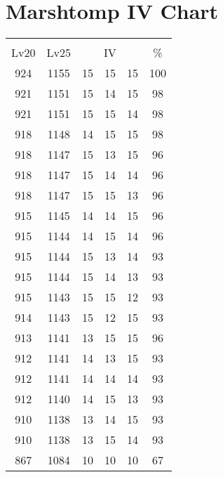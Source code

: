 \documentclass{article}%
\begin{document}
%
\normalsize%
\section{Marshtomp IV Chart}%
\label{sec:Marshtomp IV Chart}%
\renewcommand{\arraystretch}{1.5}%
\begin{tabular}{|c|c|c|c|c|c|}%
\hline%
\multicolumn{6}{|c|}{\textcolor{white}{ 
\linebreak{Marshtomp}
}%
\cellcolor{black}}\\%
\multicolumn{1}{|c}{Lv20}&\multicolumn{1}{c|}{Lv25}&\multicolumn{3}{c|}{IV}&\multicolumn{1}{|c|}{\%}\\%
\hline%
\rowcolor{color100}%
924&1155&15&15&15&100\\%
\hline%
\rowcolor{color98}%
921&1151&15&14&15&98\\%
\hline%
\rowcolor{color98}%
921&1151&15&15&14&98\\%
\hline%
\rowcolor{color98}%
918&1148&14&15&15&98\\%
\hline%
\rowcolor{color96}%
918&1147&15&13&15&96\\%
\hline%
\rowcolor{color96}%
918&1147&15&14&14&96\\%
\hline%
\rowcolor{color96}%
918&1147&15&15&13&96\\%
\hline%
\rowcolor{color96}%
915&1145&14&14&15&96\\%
\hline%
\rowcolor{color96}%
915&1144&14&15&14&96\\%
\hline%
\rowcolor{color93}%
915&1144&15&13&14&93\\%
\hline%
\rowcolor{color93}%
915&1144&15&14&13&93\\%
\hline%
\rowcolor{color93}%
915&1143&15&15&12&93\\%
\hline%
\rowcolor{color93}%
914&1143&15&12&15&93\\%
\hline%
\rowcolor{color96}%
913&1141&13&15&15&96\\%
\hline%
\rowcolor{color93}%
912&1141&14&13&15&93\\%
\hline%
\rowcolor{color93}%
912&1141&14&14&14&93\\%
\hline%
\rowcolor{color93}%
912&1140&14&15&13&93\\%
\hline%
\rowcolor{color93}%
910&1138&13&14&15&93\\%
\hline%
\rowcolor{color93}%
910&1138&13&15&14&93\\%
\hline%
\rowcolor{color91}%
867&1084&10&10&10&67\\%
\end{tabular}

%
\end{document}
